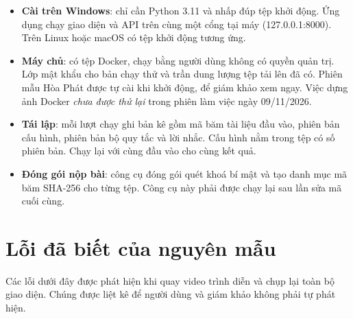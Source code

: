 \begin{itemize}
\item \textbf{Cài trên Windows}: chỉ cần Python 3.11 và nhấp đúp tệp khởi động. Ứng dụng chạy giao diện và API trên cùng một cổng tại máy (127.0.0.1:8000). Trên Linux hoặc macOS có tệp khởi động tương ứng.
\item \textbf{Máy chủ}: có tệp Docker, chạy bằng người dùng không có quyền quản trị. Lớp mật khẩu cho bản chạy thử và trần dung lượng tệp tải lên đã có. Phiên mẫu Hòa Phát được tự cài khi khởi động, để giám khảo xem ngay. Việc dựng ảnh Docker \emph{chưa được thử lại} trong phiên làm việc ngày 09/11/2026.
\item \textbf{Tái lập}: mỗi lượt chạy ghi bản kê gồm mã băm tài liệu đầu vào, phiên bản cấu hình, phiên bản bộ quy tắc và lời nhắc. Cấu hình nằm trong tệp có số phiên bản. Chạy lại với cùng đầu vào cho cùng kết quả.
\item \textbf{Đóng gói nộp bài}: công cụ đóng gói quét khoá bí mật và tạo danh mục mã băm SHA-256 cho từng tệp. Công cụ này phải được chạy lại sau lần sửa mã cuối cùng.
\end{itemize}

\section{Lỗi đã biết của nguyên mẫu}\label{sec:loi-nguyen-mau}

Các lỗi dưới đây được phát hiện khi quay video trình diễn và chụp lại toàn bộ giao diện. Chúng được liệt kê để người dùng và giám khảo không phải tự phát hiện.

